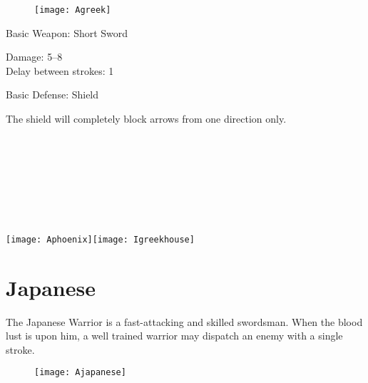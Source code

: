 \begin{wrapfigure}{r}{0.5\textwidth}
	\begin{center}
		\vspace{-20pt}
		\texttt{[image: Agreek]}
	\end{center}
	\vspace{-20pt}
\end{wrapfigure}

Basic Weapon: Short Sword
\begin{adjustwidth}{1cm}{}
	Damage: 5–8 \\
	Delay between strokes: 1
\end{adjustwidth}
Basic Defense: Shield
\begin{adjustwidth}{1cm}{}
	The shield will completely block arrows from one direction only. \\ \\ \\ \\ \\ \\ \\ \\ 
\end{adjustwidth}

\begin{center}
	\texttt{[image: Aphoenix]}\texttt{[image: Igreekhouse]}
\end{center}

\clearpage

\section{Japanese}


The Japanese Warrior is a fast-attacking and skilled swordsman. When the blood lust is upon him, a well trained warrior may dispatch an enemy with a single stroke.

\begin{wrapfigure}{r}{0.5\textwidth}
	\begin{center}
		\vspace{-20pt}
		\texttt{[image: Ajapanese]}
	\end{center}
	\vspace{-20pt}
\end{wrapfigure}


